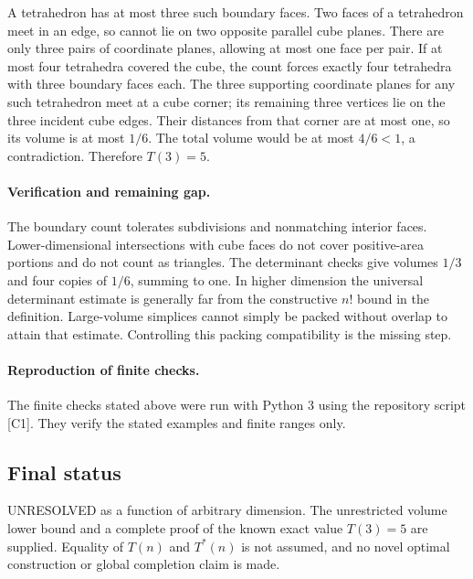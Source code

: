\documentclass[11pt,a4paper]{article}
\begin{document}
A tetrahedron has at most three such boundary faces. Two faces of
a tetrahedron meet in an edge, so cannot lie on two opposite parallel
cube planes. There are only three pairs of coordinate planes, allowing
at most one face per pair. If at most four tetrahedra covered the
cube, the count forces exactly four tetrahedra with three boundary
faces each. The three supporting coordinate planes for any such
tetrahedron meet at a cube corner; its remaining three vertices lie
on the three incident cube edges. Their distances from that corner
are at most one, so its volume is at most $1/6$. The total volume
would be at most $4/6<1$, a contradiction. Therefore $T(3)=5$.

\paragraph{Verification and remaining gap.}
The boundary count tolerates subdivisions and nonmatching interior
faces. Lower-dimensional intersections with cube faces do not cover
positive-area portions and do not count as triangles. The determinant
checks give volumes $1/3$ and four copies of $1/6$, summing to one.
In higher dimension the universal determinant estimate is generally
far from the constructive $n!$ bound in the definition. Large-volume
simplices cannot simply be packed without overlap to attain that
estimate. Controlling this packing compatibility is the missing step.

\paragraph{Reproduction of finite checks.}
The finite checks stated above were run with Python 3 using the repository
script [C1]. They verify the stated examples and finite ranges only.

\subsection{Final status}
UNRESOLVED as a function of arbitrary dimension. The unrestricted
volume lower bound and a complete proof of the known exact value
$T(3)=5$ are supplied. Equality of $T(n)$ and $T^*(n)$ is not assumed,
and no novel optimal construction or global completion claim is made.
\end{document}
